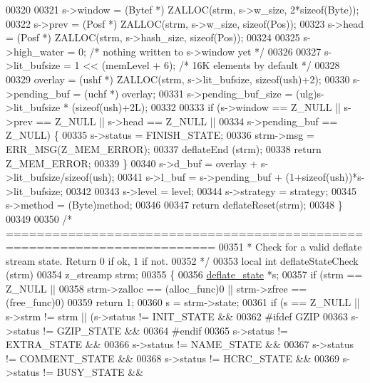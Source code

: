 \begin{DoxyCode}
00320 
00321     s->window = (Bytef *) ZALLOC(strm, s->w\_size, 2*\textcolor{keyword}{sizeof}(Byte));
00322     s->prev   = (Posf *)  ZALLOC(strm, s->w\_size, \textcolor{keyword}{sizeof}(Pos));
00323     s->head   = (Posf *)  ZALLOC(strm, s->hash\_size, \textcolor{keyword}{sizeof}(Pos));
00324 
00325     s->high\_water = 0;      \textcolor{comment}{/* nothing written to s->window yet */}
00326 
00327     s->lit\_bufsize = 1 << (memLevel + 6); \textcolor{comment}{/* 16K elements by default */}
00328 
00329     overlay = (ushf *) ZALLOC(strm, s->lit\_bufsize, \textcolor{keyword}{sizeof}(ush)+2);
00330     s->pending\_buf = (uchf *) overlay;
00331     s->pending\_buf\_size = (ulg)s->lit\_bufsize * (\textcolor{keyword}{sizeof}(ush)+2L);
00332 
00333     \textcolor{keywordflow}{if} (s->window == Z\_NULL || s->prev == Z\_NULL || s->head == Z\_NULL ||
00334         s->pending\_buf == Z\_NULL) \{
00335         s->status = FINISH\_STATE;
00336         strm->msg = ERR\_MSG(Z\_MEM\_ERROR);
00337         deflateEnd (strm);
00338         \textcolor{keywordflow}{return} Z\_MEM\_ERROR;
00339     \}
00340     s->d\_buf = overlay + s->lit\_bufsize/\textcolor{keyword}{sizeof}(ush);
00341     s->l\_buf = s->pending\_buf + (1+\textcolor{keyword}{sizeof}(ush))*s->lit\_bufsize;
00342 
00343     s->level = level;
00344     s->strategy = strategy;
00345     s->method = (Byte)method;
00346 
00347     \textcolor{keywordflow}{return} deflateReset(strm);
00348 \}
00349 
00350 \textcolor{comment}{/* =========================================================================}
00351 \textcolor{comment}{ * Check for a valid deflate stream state. Return 0 if ok, 1 if not.}
00352 \textcolor{comment}{ */}
00353 local \textcolor{keywordtype}{int} deflateStateCheck (strm)
00354     z\_streamp strm;
00355 \{
00356     \hyperlink{structinternal__state}{deflate\_state} *s;
00357     \textcolor{keywordflow}{if} (strm == Z\_NULL ||
00358         strm->zalloc == (alloc\_func)0 || strm->zfree == (free\_func)0)
00359         \textcolor{keywordflow}{return} 1;
00360     s = strm->state;
00361     \textcolor{keywordflow}{if} (s == Z\_NULL || s->strm != strm || (s->status != INIT\_STATE &&
00362 #ifdef GZIP
00363                                            s->status != GZIP\_STATE &&
00364 #endif
00365                                            s->status != EXTRA\_STATE &&
00366                                            s->status != NAME\_STATE &&
00367                                            s->status != COMMENT\_STATE &&
00368                                            s->status != HCRC\_STATE &&
00369                                            s->status != BUSY\_STATE &&

\end{DoxyCode}
